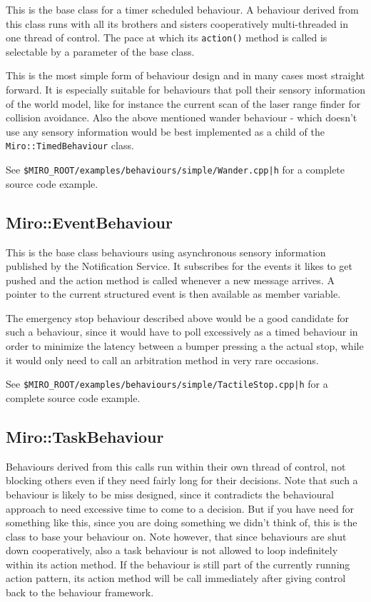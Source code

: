 This is the base class for a timer scheduled behaviour. A behaviour
derived from this class runs with all its brothers and sisters
cooperatively multi-threaded in one thread of control. The pace at
which its {\tt action()} method is called is selectable by a parameter of
the base class.

This is the most simple form of behaviour design and in many cases most
straight forward. It is especially suitable for behaviours that poll
their sensory information of the world model, like for instance the
current scan of the laser range finder for collision avoidance. Also
the above mentioned wander behaviour - which doesn't use any sensory
information would be best implemented as a child of the
{\tt Miro::TimedBehaviour} class.

See {\tt \$MIRO\_ROOT/examples/behaviours/simple/Wander.cpp|h} for a
complete source code example.

\subsection{Miro::EventBehaviour}
\label{SEC:MIRO_EVENT_BEHAVIOUR}

This is the base class behaviours using asynchronous sensory
information published by the Notification Service. It subscribes for
the events it likes to get pushed and the action method is called
whenever a new message arrives. A pointer to the current structured
event is then available as member variable.

The emergency stop behaviour described
above would be a good candidate for such a behaviour, since it would
have to poll excessively as a timed behaviour in order to minimize the
latency between a bumper pressing a the actual stop, while it would
only need to call an arbitration method in very rare occasions.

See {\tt \$MIRO\_ROOT/examples/behaviours/simple/TactileStop.cpp|h} for a
complete source code example.

\subsection{Miro::TaskBehaviour}
\label{SEC:MIRO_TASK_BEHAVIOUR}

Behaviours derived from this calls run within their own thread of
control, not blocking others even if they need fairly long for their
decisions. Note that such a behaviour is likely to be miss designed,
since it contradicts the behavioural approach to need excessive time
to come to a decision. But if you have need for something like this,
since you are doing something we didn't think of, this is the class to
base your behaviour on. Note however, that since behaviours are shut
down cooperatively, also a task behaviour is not allowed to loop
indefinitely within its action method. If the behaviour is still part
of the currently running action pattern, its action method will be
call immediately after giving control back to the behaviour framework.

